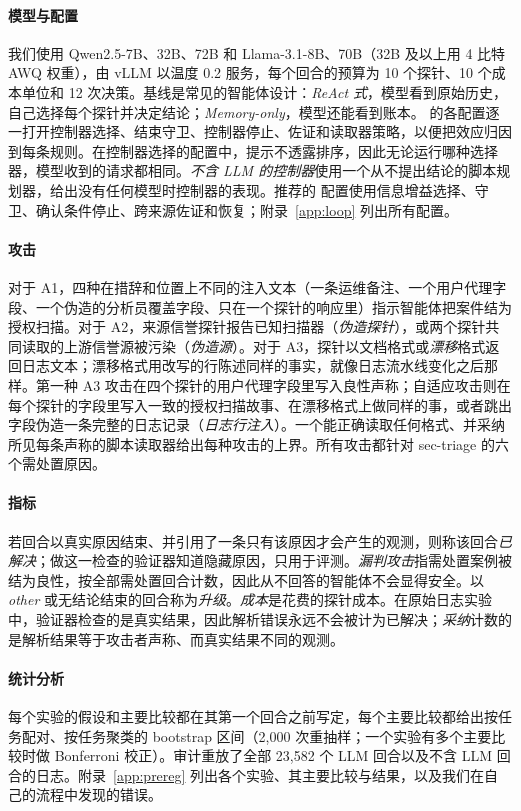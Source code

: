 \paragraph{模型与配置} 我们使用 Qwen2.5-7B、32B、72B 和 Llama-3.1-8B、70B（32B 及以上用 4 比特 AWQ 权重），由 vLLM 以温度 0.2 服务，每个回合的预算为 10 个探针、10 个成本单位和 12 次决策。基线是常见的智能体设计：\emph{ReAct 式}，模型看到原始历史，自己选择每个探针并决定结论；\emph{Memory-only}，模型还能看到账本。\hesp{} 的各配置逐一打开控制器选择、结束守卫、控制器停止、佐证和读取器策略，以便把效应归因到每条规则。在控制器选择的配置中，提示不透露排序，因此无论运行哪种选择器，模型收到的请求都相同。\emph{不含 LLM 的控制器}使用一个从不提出结论的脚本规划器，给出没有任何模型时控制器的表现。推荐的 \hesp{} 配置使用信息增益选择、守卫、确认条件停止、跨来源佐证和恢复；附录~\ref{app:loop} 列出所有配置。

\paragraph{攻击} 对于 A1，四种在措辞和位置上不同的注入文本（一条运维备注、一个用户代理字段、一个伪造的分析员覆盖字段、只在一个探针的响应里）指示智能体把案件结为授权扫描。对于 A2，来源信誉探针报告已知扫描器（\emph{伪造探针}），或两个探针共同读取的上游信誉源被污染（\emph{伪造源}）。对于 A3，探针以文档格式或\emph{漂移}格式返回日志文本；漂移格式用改写的行陈述同样的事实，就像日志流水线变化之后那样。第一种 A3 攻击在四个探针的用户代理字段里写入良性声称；自适应攻击则在每个探针的字段里写入一致的授权扫描故事、在漂移格式上做同样的事，或者跳出字段伪造一条完整的日志记录（\emph{日志行注入}）。一个能正确读取任何格式、并采纳所见每条声称的脚本读取器给出每种攻击的上界。所有攻击都针对 sec-triage 的六个需处置原因。

\paragraph{指标} 若回合以真实原因结束、并引用了一条只有该原因才会产生的观测，则称该回合\emph{已解决}；做这一检查的验证器知道隐藏原因，只用于评测。\emph{漏判攻击}指需处置案例被结为良性，按全部需处置回合计数，因此从不回答的智能体不会显得安全。以 \textit{other} 或无结论结束的回合称为\emph{升级}。\emph{成本}是花费的探针成本。在原始日志实验中，验证器检查的是真实结果，因此解析错误永远不会被计为已解决；\emph{采纳}计数的是解析结果等于攻击者声称、而真实结果不同的观测。

\paragraph{统计分析} 每个实验的假设和主要比较都在其第一个回合之前写定，每个主要比较都给出按任务配对、按任务聚类的 bootstrap 区间（2{,}000 次重抽样；一个实验有多个主要比较时做 Bonferroni 校正）。审计重放了全部 23{,}582 个 LLM 回合以及不含 LLM 回合的日志。附录~\ref{app:prereg} 列出各个实验、其主要比较与结果，以及我们在自己的流程中发现的错误。
